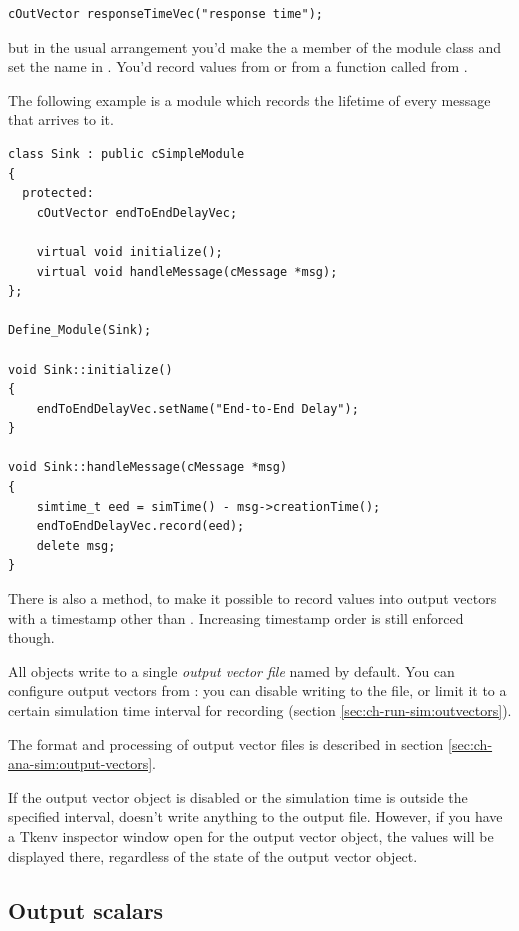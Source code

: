 \begin{verbatim}
cOutVector responseTimeVec("response time");
\end{verbatim}

but in the usual arrangement you'd make the  a member
of the module class and set the name in . You'd
record values from  or from a function called from
.

The following example is a  module which records the lifetime
of every message that arrives to it.

\begin{verbatim}
class Sink : public cSimpleModule
{
  protected:
    cOutVector endToEndDelayVec;

    virtual void initialize();
    virtual void handleMessage(cMessage *msg);
};

Define_Module(Sink);

void Sink::initialize()
{
    endToEndDelayVec.setName("End-to-End Delay");
}

void Sink::handleMessage(cMessage *msg)
{
    simtime_t eed = simTime() - msg->creationTime();
    endToEndDelayVec.record(eed);
    delete msg;
}
\end{verbatim}

There is also a  method{\new}, to make it
possible to record values into output vectors with a timestamp other than
. Increasing timestamp order is still enforced though.

All  objects write to a single \textit{output vector file}
named  by default.
You can configure output vectors from :
you can disable writing to the file, or limit it to a certain
simulation time interval for recording (section
\ref{sec:ch-run-sim:outvectors}).

The format and processing of output vector files is described in section
\ref{sec:ch-ana-sim:output-vectors}.

If the output vector object is disabled or the simulation time is
outside the specified interval,  doesn't write
anything to the output file. However, if you have a Tkenv inspector
window open for the output vector object,
the values will be displayed there, regardless of the state of the
output vector object.



\subsection{Output scalars}

